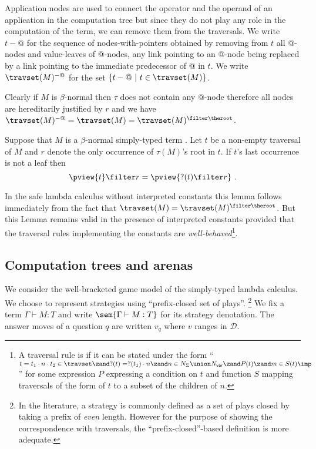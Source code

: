 Application nodes are used to connect the operator and the operand
of an application in the computation tree but since they do not play
any role in the computation of the term, we can remove them from the
traversals.  We write $t-@$ for the sequence of nodes-with-pointers
obtained by removing from $t$ all @-nodes and value-leaves of
@-nodes, any link pointing to an @-node being replaced by a link
pointing to the immediate predecessor of @ in $t$. We write
$\travset(M)^{-@}$ for the set $\{ t - @ \ | \  t \in \travset(M)
\}$.
\begin{remark}
Clearly if $M$ is $\beta$-normal then $\tau$ does not contain any
@-node therefore all nodes are hereditarily justified by $r$ and we
have $\travset(M)^{-@} = \travset(M) = \travset(M)^{\filter \theroot
}$.
\end{remark}



\begin{lemma}
\label{lem:betanf_trav_pview_red} Suppose that $M$ is a
$\beta$-normal simply-typed term . Let $t$ be a non-empty traversal
of $M$ and $r$ denote the only occurrence of $\tau(M)$'s root in
$t$. If $t$'s last occurrence is not a leaf then
$$ \pview{t} \filter r = \pview{?(t) \filter  r }\ .$$
\end{lemma}
In the safe lambda calculus without interpreted constants this lemma
follows immediately from the fact that $\travset(M) =
\travset(M)^{\filter \theroot}$. But this Lemma remains valid in the
presence of interpreted constants provided that the traversal rules
implementing the constants are \emph{well-behaved}\footnote{A
traversal rule is  if it can be stated under
the form ``$t = t_1\cdot n \cdot t_2 \in \travset \zand ?(t) =
?(t_1) \cdot n \zand n \in N_{\Sigma}\union N_{\sf var} \zand P(t)
\zand m\in S(t) \imp\ $'' for some expression $P$ expressing a
condition on $t$ and function $S$ mapping traversals of the form of
$t$ to a subset of the children of $n$.}.

\subsection{Computation trees and arenas}
We consider the well-bracketed game model of the simply-typed lambda
calculus.  We choose to represent strategies using ``prefix-closed
set of plays''. \footnote{In the literature, a strategy is commonly
defined as a set of plays closed by taking a prefix of \emph{even}
length. However for the purpose of showing the correspondence with
traversals, the ``prefix-closed''-based definition is more
adequate.} We fix a term $\Gamma \vdash M : T$ and write
$\sem{\Gamma \vdash M : T}$ for its strategy denotation. The answer
moves of a question $q$ are written $v_q$ where $v$ ranges in
$\mathcal{D}$.

